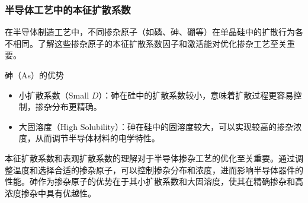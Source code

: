 \documentclass[xcolor=table,dvipsnames,svgnames,aspectratio=169]{ctexbeamer}
\begin{document}
\begin{frame}
  \frametitle{半导体工艺中的本征扩散系数}
    
  在半导体制造工艺中，不同掺杂原子（如磷、砷、硼等）在单晶硅中的扩散行为各不相同。了解这些掺杂原子的本征扩散系数因子和激活能对优化掺杂工艺至关重要。
    
    砷（As）的优势
    
    \begin{itemize}
      \item 小扩散系数（Small \( D \)）：砷在硅中的扩散系数较小，意味着扩散过程更容易控制，掺杂分布更精确。
      \item 大固溶度（High Solubility）：砷在硅中的固溶度较大，可以实现较高的掺杂浓度，从而调节半导体材料的电学特性。
    \end{itemize}

    本征扩散系数和表观扩散系数的理解对于半导体掺杂工艺的优化至关重要。通过调整温度和选择合适的掺杂原子，可以控制掺杂分布和浓度，进而影响半导体器件的性能。砷作为掺杂原子的优势在于其小扩散系数和大固溶度，使其在精确掺杂和高浓度掺杂中具有优越性。
\end{frame}

\makebottom
\end{document}
